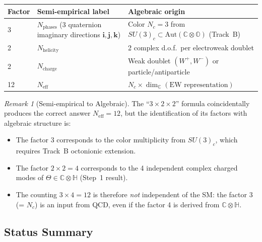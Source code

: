 \documentclass[11pt,a4paper]{article}
\newcommand{\C}{\mathbb{C}}
\renewcommand{\H}{\mathbb{H}}
\renewcommand{\O}{\mathbb{O}}
\newcommand{\Aut}{\mathrm{Aut}}
\theoremstyle{remark}
\newtheorem{remark}{Remark}
\begin{document}
\begin{center}
\begin{tabular}{lll}
  \toprule
  Factor & Semi-empirical label & Algebraic origin \\
  \midrule
  3 & $N_{\mathrm{phases}}$ (3 quaternion imaginary directions $\mathbf{i},\mathbf{j},\mathbf{k}$)
    & Color $N_c = 3$ from $SU(3)_c \subset \Aut(\C\otimes\O)$ (Track~B) \\
  2 & $N_{\mathrm{helicity}}$ & 2 complex d.o.f.\ per electroweak doublet \\
  2 & $N_{\mathrm{charge}}$ & Weak doublet $(W^+, W^-)$ or particle/antiparticle \\
  \midrule
  12 & $N_{\mathrm{eff}}$ & $N_c \times \dim_{\C}(\text{EW representation})$ \\
  \bottomrule
\end{tabular}
\end{center}

\begin{remark}[Semi-empirical to Algebraic]
The ``$3 \times 2 \times 2$'' formula coincidentally produces the correct answer
$N_{\mathrm{eff}} = 12$, but the identification of its factors with algebraic structure is:
\begin{itemize}
  \item The factor 3 corresponds to the color multiplicity from $SU(3)_c$, which requires
    Track~B octonionic extension.
  \item The factor $2 \times 2 = 4$ corresponds to the 4 independent complex charged modes of
    $\Theta \in \C\otimes\H$ (Step~1 result).
  \item The counting $3 \times 4 = 12$ is therefore \emph{not} independent of the SM: the
    factor 3 (= $N_c$) is an input from QCD, even if the factor 4 is derived from $\C\otimes\H$.
\end{itemize}
\end{remark}

\subsection{Status Summary}
\end{document}
